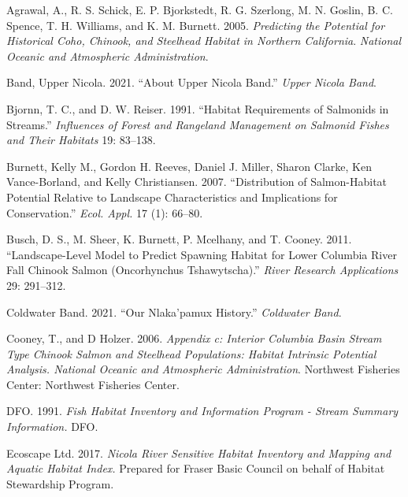 \documentclass[
  letterpaper,
  DIV=11,
  numbers=noendperiod]{scrreprt}
\newlength{\cslhangindent}
\newlength{\cslentryspacingunit} %
\newenvironment{CSLReferences}[2] %
 {%
  \setlength{\parindent}{0pt}
  \ifodd #1
  \let\oldpar\par
  \def\par{\hangindent=\cslhangindent\oldpar}
  \fi
  \setlength{\parskip}{#2\cslentryspacingunit}
 }%
 {}
\begin{document}
\hypertarget{refs}{}
\begin{CSLReferences}{1}{0}
\leavevmode{}%
Agrawal, A., R. S. Schick, E. P. Bjorkstedt, R. G. Szerlong, M. N.
Goslin, B. C. Spence, T. H. Williams, and K. M. Burnett. 2005.
\emph{Predicting the Potential for Historical Coho, Chinook, and
Steelhead Habitat in Northern California}. \emph{National Oceanic and
Atmospheric Administration}.

\leavevmode{}%
Band, Upper Nicola. 2021. {``About Upper Nicola Band.''} \emph{Upper
Nicola Band}.

\leavevmode{}%
Bjornn, T. C., and D. W. Reiser. 1991. {``Habitat Requirements of
Salmonids in Streams.''} \emph{Influences of Forest and Rangeland
Management on Salmonid Fishes and Their Habitats} 19: 83--138.

\leavevmode{}%
Burnett, Kelly M., Gordon H. Reeves, Daniel J. Miller, Sharon Clarke,
Ken Vance-Borland, and Kelly Christiansen. 2007. {``Distribution of
Salmon-Habitat Potential Relative to Landscape Characteristics and
Implications for Conservation.''} \emph{Ecol. Appl.} 17 (1): 66--80.

\leavevmode{}%
Busch, D. S., M. Sheer, K. Burnett, P. Mcelhany, and T. Cooney. 2011.
{``Landscape-Level Model to Predict Spawning Habitat for Lower Columbia
River Fall Chinook Salmon (Oncorhynchus Tshawytscha).''} \emph{River
Research Applications} 29: 291--312.

\leavevmode{}%
Coldwater Band. 2021. {``Our Nlaka'pamux History.''} \emph{Coldwater
Band}.

\leavevmode{}%
Cooney, T., and D Holzer. 2006. \emph{Appendix c: Interior Columbia
Basin Stream Type Chinook Salmon and Steelhead Populations: Habitat
Intrinsic Potential Analysis. National Oceanic and Atmospheric
Administration}. Northwest Fisheries Center: Northwest Fisheries Center.

\leavevmode{}%
DFO. 1991. \emph{Fish Habitat Inventory and Information Program - Stream
Summary Information.} DFO.

\leavevmode{}%
Ecoscape Ltd. 2017. \emph{Nicola River Sensitive Habitat Inventory and
Mapping and Aquatic Habitat Index.} Prepared for Fraser Basic Council on
behalf of Habitat Stewardship Program.


\end{CSLReferences}
\end{document}
